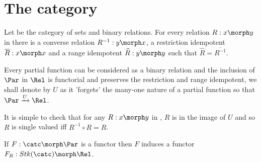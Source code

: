 \section{The category \Rel}

 Let \Rel be the category of sets and binary relations. 
For every relation $R:x \morph y$ in \Rel 
there is a converse relation $R^{-1} :y \morph x$,
 a restriction idempotent $\overline{R}: x \morph x$ and 
 a range idempotent $\widehat{R} : y \morph y$ such that
$\widehat{R} = \overline{R^{-1}}$.

 Every partial function can be considered as a binary relation and the inclusion of $\Par$ in $\Rel$ is functorial
and preserves the restriction and range idempotent, we shall denote 
by $U$ as it 'forgets' the many-one nature of a partial function so
that
$\Par \xrightarrow{U} \Rel$.

It is simple to check that for any $R:x \morph y$ in \Rel, $R$ is in the image of $U$ and so
$R$ is single valued iff $R^{-1} \circ R = \widehat{R}$. 

If $F: \catc \morph \Par$ is a functor then $F$ induces 
a functor $F_R : Stk(\catc) \morph \Rel$. 

